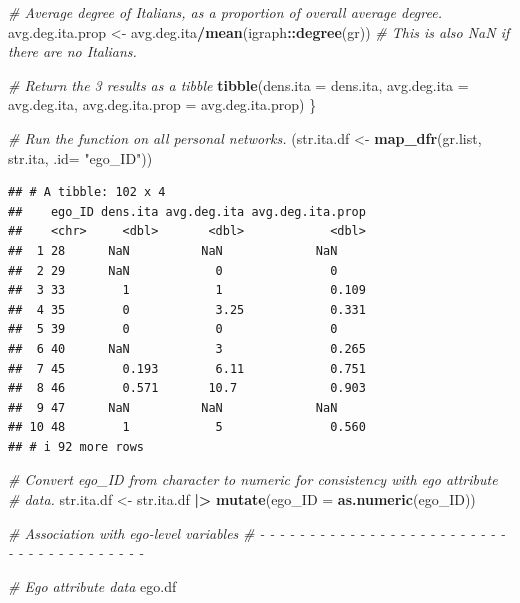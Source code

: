 \documentclass[
]{book}
\newenvironment{Shaded}{\begin{snugshade}}{\end{snugshade}}
\newcommand{\AttributeTok}[1]{\textcolor[rgb]{0.13,0.29,0.53}{#1}}
\newcommand{\CommentTok}[1]{\textcolor[rgb]{0.56,0.35,0.01}{\textit{#1}}}
\newcommand{\FunctionTok}[1]{\textcolor[rgb]{0.13,0.29,0.53}{\textbf{#1}}}
\newcommand{\NormalTok}[1]{#1}
\newcommand{\OtherTok}[1]{\textcolor[rgb]{0.56,0.35,0.01}{#1}}
\newcommand{\SpecialCharTok}[1]{\textcolor[rgb]{0.81,0.36,0.00}{\textbf{#1}}}
\newcommand{\StringTok}[1]{\textcolor[rgb]{0.31,0.60,0.02}{#1}}
\begin{document}
\begin{Shaded}
\begin{Highlighting}[]
  \CommentTok{\# Average degree of Italians, as a proportion of overall average degree.}
\NormalTok{  avg.deg.ita.prop }\OtherTok{\textless{}{-}}\NormalTok{ avg.deg.ita}\SpecialCharTok{/}\FunctionTok{mean}\NormalTok{(igraph}\SpecialCharTok{::}\FunctionTok{degree}\NormalTok{(gr))}
  \CommentTok{\# This is also NaN if there are no Italians. }
  
  \CommentTok{\# Return the 3 results as a tibble}
  \FunctionTok{tibble}\NormalTok{(}\AttributeTok{dens.ita =}\NormalTok{ dens.ita, }
         \AttributeTok{avg.deg.ita =}\NormalTok{ avg.deg.ita, }
         \AttributeTok{avg.deg.ita.prop =}\NormalTok{ avg.deg.ita.prop)}
\NormalTok{\}}

\CommentTok{\# Run the function on all personal networks.}
\NormalTok{(str.ita.df }\OtherTok{\textless{}{-}} \FunctionTok{map\_dfr}\NormalTok{(gr.list, str.ita, }\AttributeTok{.id=} \StringTok{"ego\_ID"}\NormalTok{))}
\end{Highlighting}
\end{Shaded}

\begin{verbatim}
## # A tibble: 102 x 4
##    ego_ID dens.ita avg.deg.ita avg.deg.ita.prop
##    <chr>     <dbl>       <dbl>            <dbl>
##  1 28      NaN          NaN             NaN    
##  2 29      NaN            0               0    
##  3 33        1            1               0.109
##  4 35        0            3.25            0.331
##  5 39        0            0               0    
##  6 40      NaN            3               0.265
##  7 45        0.193        6.11            0.751
##  8 46        0.571       10.7             0.903
##  9 47      NaN          NaN             NaN    
## 10 48        1            5               0.560
## # i 92 more rows
\end{verbatim}

\begin{Shaded}
\begin{Highlighting}[]
\CommentTok{\# Convert ego\_ID from character to numeric for consistency with ego attribute}
\CommentTok{\# data.}
\NormalTok{str.ita.df }\OtherTok{\textless{}{-}}\NormalTok{ str.ita.df }\SpecialCharTok{|\textgreater{}} 
  \FunctionTok{mutate}\NormalTok{(}\AttributeTok{ego\_ID =} \FunctionTok{as.numeric}\NormalTok{(ego\_ID))}

\CommentTok{\# Association with ego{-}level variables}
\CommentTok{\# {-} {-} {-} {-} {-} {-} {-} {-} {-} {-} {-} {-} {-} {-} {-} {-} {-} {-} {-} {-} {-} {-} {-} {-} {-} {-} {-} {-} {-} {-} {-} {-} {-} {-} {-} {-} {-} {-} {-} }

\CommentTok{\# Ego attribute data}
\NormalTok{ego.df}
\end{Highlighting}
\end{Shaded}
\end{document}
